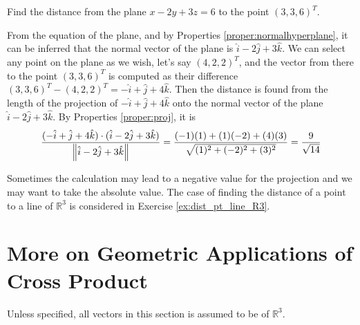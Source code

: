 \begin{exmp}
Find the distance from the plane $x-2y+3z = 6$ to the point $(3,3,6)^T$.
\end{exmp}
\begin{solution}
From the equation of the plane, and by Properties \ref{proper:normalhyperplane}, it can be inferred that the normal vector of the plane is $\hat{i} - 2\hat{j} + 3\hat{k}$. We can select any point on the plane as we wish, let's say $(4,2,2)^T$, and the vector from there to the point $(3,3,6)^T$ is computed as their difference $(3,3,6)^T - (4,2,2)^T = -\hat{i} + \hat{j} + 4\hat{k}$. Then the distance is found from the length of the projection of $-\hat{i} + \hat{j} + 4\hat{k}$ onto the normal vector of the plane $\hat{i} - 2\hat{j} + 3\hat{k}$. By Properties \ref{proper:proj}, it is
\begin{align*}
\frac{(-\hat{i} + \hat{j} + 4\hat{k}) \cdot (\hat{i} - 2\hat{j} + 3\hat{k})}{\norm{\hat{i} - 2\hat{j} + 3\hat{k}}} = \frac{(-1)(1)+(1)(-2)+(4)(3)}{\sqrt{(1)^2 + (-2)^2 + (3)^2}} = \frac{9}{\sqrt{14}}
\end{align*}
\end{solution}
Sometimes the calculation may lead to a negative value for the projection and we may want to take the absolute value. The case of finding the distance of a point to a line of $\mathbb{R}^3$ is considered in Exercise \ref{ex:dist_pt_line_R3}.

\section{More on Geometric Applications of Cross Product}
Unless specified, all vectors in this section is assumed to be of $\mathbb{R}^3$.
